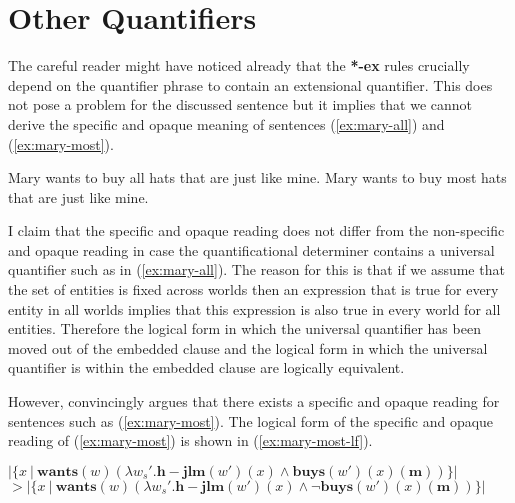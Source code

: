 \documentclass[parskip=half]{scrartcl}
\begin{document}
\section{Other Quantifiers}

The careful reader might have noticed already that the \textbf{*-ex} rules crucially depend on the quantifier phrase to contain an extensional quantifier. This does not pose a problem for the discussed sentence but it implies that we cannot derive the specific and opaque meaning of sentences (\ref{ex:mary-all}) and (\ref{ex:mary-most}).

\begin{exe}
\ex \label{ex:mary-all} Mary wants to buy all hats that are just like mine.
\ex \label{ex:mary-most} Mary wants to buy most hats that are just like mine.
\end{exe}

I claim that the specific and opaque reading does not differ from the non-specific and opaque reading in case the quantificational determiner contains a universal quantifier such as in (\ref{ex:mary-all}). The reason for this is that if we assume that the set of entities is fixed across worlds then an expression that is true for every entity in all worlds implies that this expression is also true in every world for all entities. Therefore the logical form in which the universal quantifier has been moved out of the embedded clause and the logical form in which the universal quantifier is within the embedded clause are logically equivalent. 

However, \cite{szabo2010} convincingly argues that there exists a specific and opaque reading for sentences such as (\ref{ex:mary-most}). The logical form of the specific and opaque reading of (\ref{ex:mary-most}) is shown in (\ref{ex:mary-most-lf}).

\begin{exe}
\ex \label{ex:mary-most-lf} $|\{ x \ | \ \mathbf{wants}(w)(\lambda w_s'. \mathbf{h-jlm}(w')(x) \land \mathbf{buys}(w')(x)(\mathbf{m}))  \}|  $ \\ $ > |\{ x \ | \ \mathbf{wants}(w)(\lambda w_s'. \mathbf{h-jlm}(w')(x) \land \lnot \mathbf{buys}(w')(x)(\mathbf{m}))  \}| $ 
\end{exe}
\end{document}
